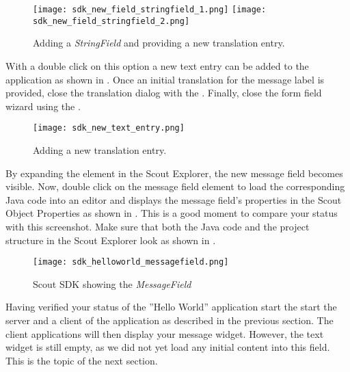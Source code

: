 \begin{figure}
\texttt{[image: sdk\_new\_field\_stringfield\_1.png]} \hspace{8mm}
\texttt{[image: sdk\_new\_field\_stringfield\_2.png]}
\caption{Adding a \textit{StringField} and providing a new translation entry.}
\end{figure}

With a double click on this option a new text entry can be added to the application as shown in .
Once an initial translation for the message label is provided, close the translation dialog with the .
Finally, close the form field wizard using the .

\begin{figure}
\texttt{[image: sdk\_new\_text\_entry.png]}
\caption{Adding a new translation entry.}
\end{figure}

By expanding the  element in the Scout Explorer, the new message field becomes visible. 
Now, double click on the message field element to load the corresponding Java code into an editor and displays the message field's properties in the Scout Object Properties as shown in .
This is a good moment to compare your status with this screenshot.
Make sure that both the Java code and the project structure in the Scout Explorer look as shown in . 

\begin{figure}
\texttt{[image: sdk\_helloworld\_messagefield.png]}
\caption{Scout SDK showing the \it{MessageField}}
\end{figure}

Having verified your status of the ''Hello World'' application start the start the server and a client of the application as described in the previous section.
The client applications will then display your message widget.
However, the text widget is still empty, as we did not yet load any initial content into this field.
This is the topic of the next section.


